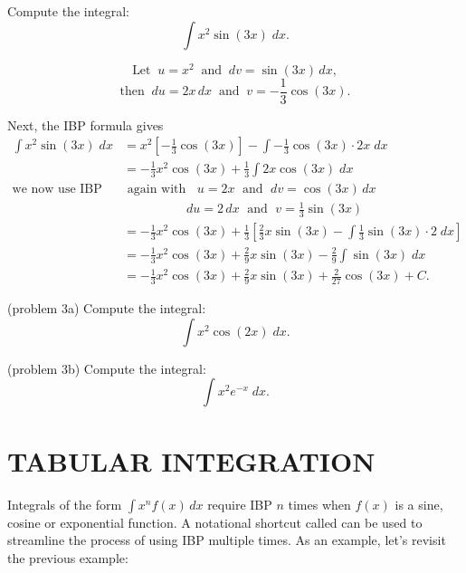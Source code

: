 \documentclass{ximera}
\begin{document}
\begin{example}
Compute the integral:
  \[
  \int x^2\sin(3x) \;dx.
  \]

\[
\text{Let} \;\; u = x^2 \;\; \text{and} \;\; dv = \sin(3x) \,dx,
\]
\[
\text{then} \;\; du = 2x \,dx \;\; \text{and} \;\; v = -\frac13 \cos(3x).
\]

Next, the IBP formula gives
\begin{align*}
\int x^2\sin(3x) \;dx &= x^2\left[-\frac13 \cos(3x)\right] - \int -\frac13 \cos(3x) \cdot 2x \; dx \\
                       &= -\frac13 x^2\cos(3x) + \frac13 \int 2x\cos(3x) \; dx\\                               
\text{we now use IBP} & \text{ again with } \;\; u = 2x \;\text{ and } \; dv = \cos(3x) \, dx\\
& \qquad \qquad \quad du = 2 \, dx \; \text{ and } \; v=\frac13 \sin(3x)\\
                       &= -\frac13 x^2\cos(3x) + \frac13\left[\frac23x\sin(3x) -  \int \frac13 \sin(3x)\cdot 2 \; dx\right]\\
                       &= -\frac13 x^2\cos(3x) + \frac29x\sin(3x) - \frac29 \int  \sin(3x) \; dx\\
                       &= -\frac13 x^2\cos(3x) + \frac29x\sin(3x) + \frac{2}{27} \cos(3x) + C.
\end{align*}

\end{example}


\begin{problem}(problem 3a)
Compute the integral:
  \[
  \int x^2\cos(2x) \;dx.
  \]

\end{problem}

\begin{problem}(problem 3b)
Compute the integral:
  \[
  \int x^2e^{-x} \;dx.
  \]

\end{problem}

\section{TABULAR INTEGRATION}

Integrals of the form $\int x^n f(x) \,dx$ require IBP $n$ times when $f(x)$ is a sine, cosine or exponential function.
A notational shortcut called  can be used to streamline the process of using IBP multiple times.
As an example, let's revisit the previous example:
\end{document}
